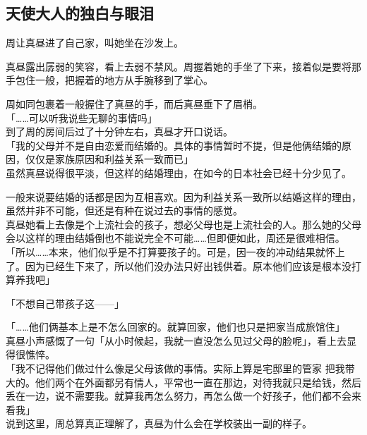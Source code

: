 \subsection{天使大人的独白与眼泪}

周让真昼进了自己家，叫她坐在沙发上。

真昼露出孱弱的笑容，看上去弱不禁风。周握着她的手坐了下来，接着似是要将那手包住一般，把握着的地方从手腕移到了掌心。

周如同包裹着一般握住了真昼的手，而后真昼垂下了眉梢。\\

「……可以听我说些无聊的事情吗」\\

到了周的房间后过了十分钟左右，真昼才开口说话。\\

「我的父母并不是自由恋爱而结婚的。具体的事情暂时不提，但是他俩结婚的原因，仅仅是家族原因和利益关系一致而已」\\

虽然真昼说得很平淡，但这样的结婚理由，在如今的日本社会已经十分少见了。

一般来说要结婚的话都是因为互相喜欢。因为利益关系一致所以结婚这样的理由，虽然并非不可能，但还是有种在说过去的事情的感觉。\\

真昼她看上去像是个上流社会的孩子，想必父母也是上流社会的人。那么她的父母会以这样的理由结婚倒也不能说完全不可能……但即便如此，周还是很难相信。\\

「所以……本来，他们似乎是不打算要孩子的。可是，因一夜的冲动结果就怀上了。因为已经生下来了，所以他们没办法只好出钱供着。原本他们应该是根本没打算养我吧」

「不想自己带孩子这——」

「……他们俩基本上是不怎么回家的。就算回家，他们也只是把家当成旅馆住」\\

真昼小声感慨了一句「从小时候起，我就一直没怎么见过父母的脸呢」，看上去显得很憔悴。\\

「我不记得他们做过什么像是父母该做的事情。实际上算是宅邸里的管家
把我带大的。他们两个在外面都另有情人，平常也一直在那边，对待我就只是给钱，然后丢在一边，说不需要我。就算我再怎么努力，再怎么做一个好孩子，他们都不会来看我」\\

说到这里，周总算真正理解了，真昼为什么会在学校装出一副的样子。\\

